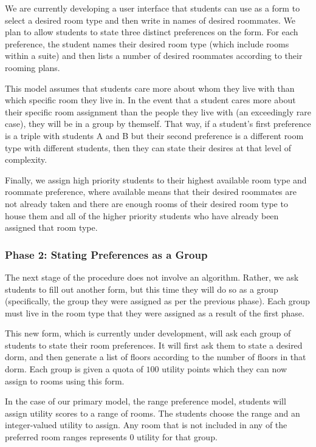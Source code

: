 \documentclass[12pt]{article}
\begin{document}
    We are currently developing a user interface that students can use as a form to select a desired room type and then write in names of desired roommates. We plan to allow students to state three distinct preferences on the form. For each preference, the student names their desired room type (which include rooms within a suite) and then lists a number of desired roommates according to their rooming plans.
    
    This model assumes that students care more about whom they live with than which specific room they live in. In the event that a student cares more about their specific room assignment than the people they live with (an exceedingly rare case), they will be in a group by themself. That way, if a student's first preference is a triple with students A and B but their second preference is a different room type with different students, then they can state their desires at that level of complexity. 
    
    Finally, we assign high priority students to their highest available room type and roommate preference, where available means that their desired roommates are not already taken and there are enough rooms of their desired room type to house them and all of the higher priority students who have already been assigned that room type.
    
    \subsubsection*{Phase 2: Stating Preferences as a Group} 
    The next stage of the procedure does not involve an algorithm. Rather, we ask students to fill out another form, but this time they will do so as a group (specifically, the group they were assigned as per the previous phase). Each group must live in the room type that they were assigned as a result of the first phase.
    
    This new form, which is currently under development, will ask each group of students to state their room preferences. It will first ask them to state a desired dorm, and then generate a list of floors according to the number of floors in that dorm. Each group is given a quota of $100$ utility points which they can now assign to rooms using this form.

    In the case of our primary model, the range preference model, students will assign utility scores to a range of rooms. The students choose the range and an integer-valued utility to assign. Any room that is not included in any of the preferred room ranges represents $0$ utility for that group.
    
\end{document}
